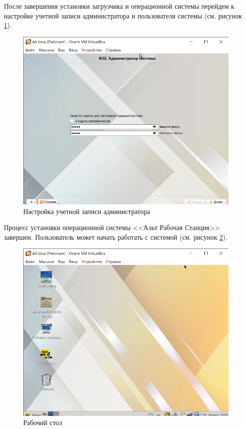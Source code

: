 \documentclass[a4paper,14pt]{extarticle}
\begin{document}
\clearpage
После завершения установки загрузчика и операционной системы перейдем к настройке учетной записи администратора и пользователя системы (см. рисунок \ref{fig:admin}).
\begin{figure}[h!]
	\centering
	\includegraphics[width=0.6\linewidth]{"images/Практика МИРЭА/Alt linux [Работает] - Oracle VM VirtualBox 18.03.2022 15_02_54"}
	\caption{Настройка учетной записи администратора}
	\label{fig:admin}
\end{figure}
Процесс установки операционной системы <<Альт Рабочая Станция>> завершен. Пользователь может начать работать с системой (см. рисунок  \ref{fig:desktop}).
\begin{figure}[h!]
	\centering
	\includegraphics[width=0.6\linewidth]{"images/Практика МИРЭА/Alt linux [Работает] - Oracle VM VirtualBox 18.03.2022 15_05_04"}
	\caption{Рабочий стол}
	\label{fig:desktop}
\end{figure}
\end{document}
